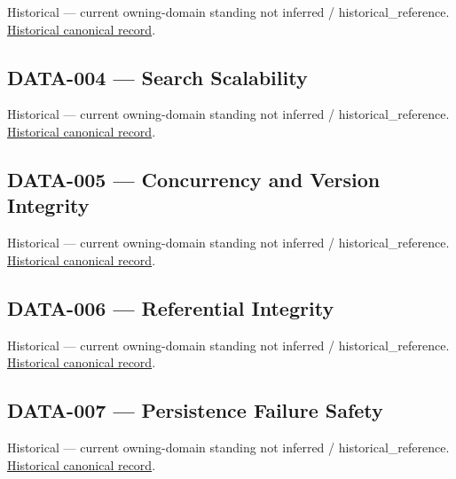 \par\label{element:ff04c3dab8a04359b9c4d62939839be7}
Historical — current owning-domain standing not inferred / historical\_reference. \href{../../../../continuum/motivation/requirement/ff04c3dab8a04359b9c4d62939839be7.md}{Historical canonical record}.\par

\subsection{DATA-004 — Search Scalability}

\par\label{element:f27e74b6cb13454aa4339932436971e3}
Historical — current owning-domain standing not inferred / historical\_reference. \href{../../../../continuum/motivation/requirement/f27e74b6cb13454aa4339932436971e3.md}{Historical canonical record}.\par

\subsection{DATA-005 — Concurrency and Version Integrity}

\par\label{element:7f40b2f4947845d287564b43f812b6c8}
Historical — current owning-domain standing not inferred / historical\_reference. \href{../../../../continuum/motivation/requirement/7f40b2f4947845d287564b43f812b6c8.md}{Historical canonical record}.\par

\subsection{DATA-006 — Referential Integrity}

\par\label{element:4a8a79f520394cfe863f473ec2a31b34}
Historical — current owning-domain standing not inferred / historical\_reference. \href{../../../../continuum/motivation/requirement/4a8a79f520394cfe863f473ec2a31b34.md}{Historical canonical record}.\par

\subsection{DATA-007 — Persistence Failure Safety}

\par\label{element:40ed2565d0d1467cbbfcf5706924de94}
Historical — current owning-domain standing not inferred / historical\_reference. \href{../../../../continuum/motivation/requirement/40ed2565d0d1467cbbfcf5706924de94.md}{Historical canonical record}.\par

